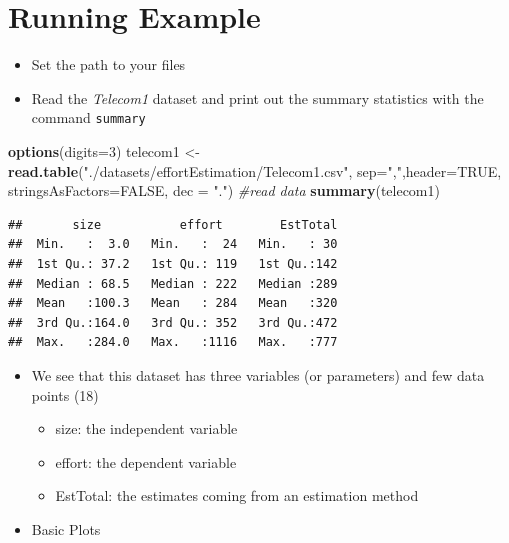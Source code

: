 \documentclass[]{book}
\newenvironment{Shaded}{\begin{snugshade}}{\end{snugshade}}
\newcommand{\KeywordTok}[1]{\textcolor[rgb]{0.13,0.29,0.53}{\textbf{{#1}}}}
\newcommand{\DataTypeTok}[1]{\textcolor[rgb]{0.13,0.29,0.53}{{#1}}}
\newcommand{\DecValTok}[1]{\textcolor[rgb]{0.00,0.00,0.81}{{#1}}}
\newcommand{\StringTok}[1]{\textcolor[rgb]{0.31,0.60,0.02}{{#1}}}
\newcommand{\CommentTok}[1]{\textcolor[rgb]{0.56,0.35,0.01}{\textit{{#1}}}}
\newcommand{\OtherTok}[1]{\textcolor[rgb]{0.56,0.35,0.01}{{#1}}}
\newcommand{\NormalTok}[1]{{#1}}
\providecommand{\tightlist}{%
  \setlength{\itemsep}{0pt}\setlength{\parskip}{0pt}}
\begin{document}
\section{Running Example}\label{running-example}

\begin{itemize}
\tightlist
\item
  Set the path to your files
\item
  Read the \emph{Telecom1} dataset and print out the summary statistics
  with the command \texttt{summary}
\end{itemize}

\begin{Shaded}
\begin{Highlighting}[]
\KeywordTok{options}\NormalTok{(}\DataTypeTok{digits=}\DecValTok{3}\NormalTok{)}
\NormalTok{telecom1 <-}\StringTok{ }\KeywordTok{read.table}\NormalTok{(}\StringTok{"./datasets/effortEstimation/Telecom1.csv"}\NormalTok{, }\DataTypeTok{sep=}\StringTok{","}\NormalTok{,}\DataTypeTok{header=}\OtherTok{TRUE}\NormalTok{, }\DataTypeTok{stringsAsFactors=}\OtherTok{FALSE}\NormalTok{, }\DataTypeTok{dec =} \StringTok{"."}\NormalTok{) }\CommentTok{#read data}
\KeywordTok{summary}\NormalTok{(telecom1)}
\end{Highlighting}
\end{Shaded}

\begin{verbatim}
##       size           effort        EstTotal  
##  Min.   :  3.0   Min.   :  24   Min.   : 30  
##  1st Qu.: 37.2   1st Qu.: 119   1st Qu.:142  
##  Median : 68.5   Median : 222   Median :289  
##  Mean   :100.3   Mean   : 284   Mean   :320  
##  3rd Qu.:164.0   3rd Qu.: 352   3rd Qu.:472  
##  Max.   :284.0   Max.   :1116   Max.   :777
\end{verbatim}

\begin{itemize}
\tightlist
\item
  We see that this dataset has three variables (or parameters) and few
  data points (18)

  \begin{itemize}
  \tightlist
  \item
    size: the independent variable
  \item
    effort: the dependent variable
  \item
    EstTotal: the estimates coming from an estimation method
  \end{itemize}
\item
  Basic Plots
\end{itemize}
\end{document}
